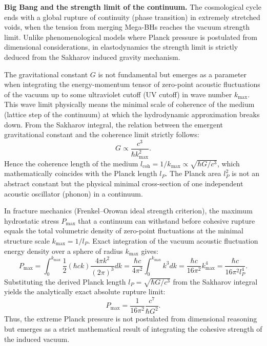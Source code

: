 \documentclass[11pt,a4paper]{article}
\begin{document}
\textbf{Big Bang and the strength limit of the continuum.}
The cosmological cycle ends with a global rupture of continuity (phase transition) in extremely stretched voids, when the tension from merging Mega-BHs reaches the vacuum strength limit. Unlike phenomenological models where Planck pressure is postulated from dimensional considerations, in elastodynamics the strength limit is strictly deduced from the Sakharov induced gravity mechanism.

The gravitational constant $G$ is not fundamental but emerges as a parameter when integrating the energy-momentum tensor of zero-point acoustic fluctuations of the vacuum up to some ultraviolet cutoff (UV cutoff) in wave number $k_{\text{max}}$. This wave limit physically means the minimal scale of coherence of the medium (lattice step of the continuum) at which the hydrodynamic approximation breaks down.
From the Sakharov integral, the relation between the emergent gravitational constant and the coherence limit strictly follows:
\begin{equation}
G \propto \frac{c^3}{\hbar k_{\text{max}}^2}.
\end{equation}
Hence the coherence length of the medium $l_{\text{coh}} = 1/k_{\text{max}} \propto \sqrt{\hbar G / c^3}$, which mathematically coincides with the Planck length $l_P$. The Planck area $l_P^2$ is not an abstract constant but the physical minimal cross-section of one independent acoustic oscillator (phonon) in a continuum.

In fracture mechanics (Frenkel–Orowan ideal strength criterion), the maximum hydrostatic stress $P_{\text{max}}$ that a continuum can withstand before cohesive rupture equals the total volumetric density of zero-point fluctuations at the minimal structure scale $k_{\text{max}} = 1/l_P$.
Exact integration of the vacuum acoustic fluctuation energy density over a sphere of radius $k_{\text{max}}$ gives:
\begin{equation}
P_{\text{max}} = \int_0^{k_{\text{max}}} \frac{1}{2} (\hbar c k) \frac{4\pi k^2}{(2\pi)^3} dk = \frac{\hbar c}{4\pi^2} \int_0^{k_{\text{max}}} k^3 dk = \frac{\hbar c}{16\pi^2} k_{\text{max}}^4 = \frac{\hbar c}{16\pi^2 l_P^4}.
\end{equation}
Substituting the derived Planck length $l_P = \sqrt{\hbar G / c^3}$ from the Sakharov integral yields the analytically exact absolute rupture limit:
\begin{equation}
P_{\text{max}} = \frac{1}{16\pi^2} \frac{c^7}{\hbar G^2}.
\end{equation}
Thus, the extreme Planck pressure is not postulated from dimensional reasoning but emerges as a strict mathematical result of integrating the cohesive strength of the induced vacuum.
\end{document}
